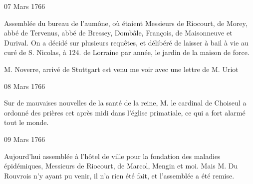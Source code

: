                      
                     
                     \begin{diary}{07 Mars 1766}{}
                        
                         Assemblée du bureau de l'aumône, où étaient
                           Messieurs
                           de Riocourt, de Morey, abbé de
                              Tervenus,
                           abbé de Bressey, Dombâle, François, de
                              Maisonneuve et Durival. On a décidé sur
                           plusieurs requêtes, et délibéré de laisser à bail
                           à vie au curé de S.
                              Nicolas, à 124.\up{#} de
                              Lorraine par année, le jardin
                              de la maison de force. 
                        \bigskip
        
        
                        
                           M. Noverre, arrivé de Stuttgart est venu
                           me voir avec une lettre de M.
                              Uriot
                        \bigskip
        
        
                     \end{diary}

                     \begin{diary}{08 Mars 1766}{}
                        
                         Sur de mauvaises nouvelles de la santé
                           de la reine,
                              M. le cardinal de Choiseul
                           a ordonné des prières cet après midi
                           dans l’église
                              primatiale, ce qui a fort
                           alarmé tout le monde. \bigskip
        
        
                     \end{diary}

                     \begin{diary}{09 Mars 1766}{}
                        
                         Aujourd'hui assemblée à l'hôtel de ville
                           pour la fondation des maladies
                              épidémiques,
                           Messieurs
                           de Riocourt, de Marcol, Mengin
                           et moi. Mais M. Du Rouvrois n'y ayant
                           pu venir, il n'a rien été fait, et l'assemblée
                           a été remise. \bigskip
        
        
                     \end{diary}

